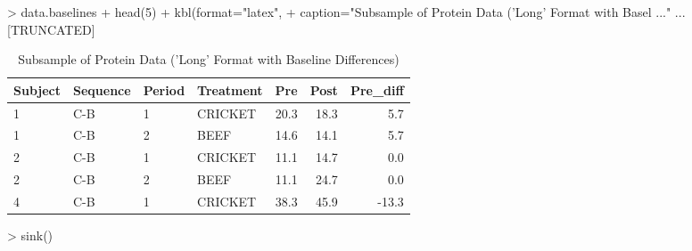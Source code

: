 
> data.baselines %
+   head(5) %
+   kbl(format="latex",
+       caption="Subsample of Protein Data ('Long' Format with Basel ..." ... [TRUNCATED] 
\begin{table}

\caption{\label{tab:preDiffSubsample}Subsample of Protein Data ('Long' Format with Baseline Differences)}
\centering
\begin{tabular}[t]{lll>{}l|rrr}
\toprule
Subject & Sequence & Period & Treatment & Pre & Post & Pre\_diff\\
\midrule
1 & C-B & 1 & CRICKET & 20.3 & 18.3 & 5.7\\
1 & C-B & 2 & BEEF & 14.6 & 14.1 & 5.7\\
2 & C-B & 1 & CRICKET & 11.1 & 14.7 & 0.0\\
2 & C-B & 2 & BEEF & 11.1 & 24.7 & 0.0\\
4 & C-B & 1 & CRICKET & 38.3 & 45.9 & -13.3\\
\bottomrule
\end{tabular}
\end{table}

> sink()
